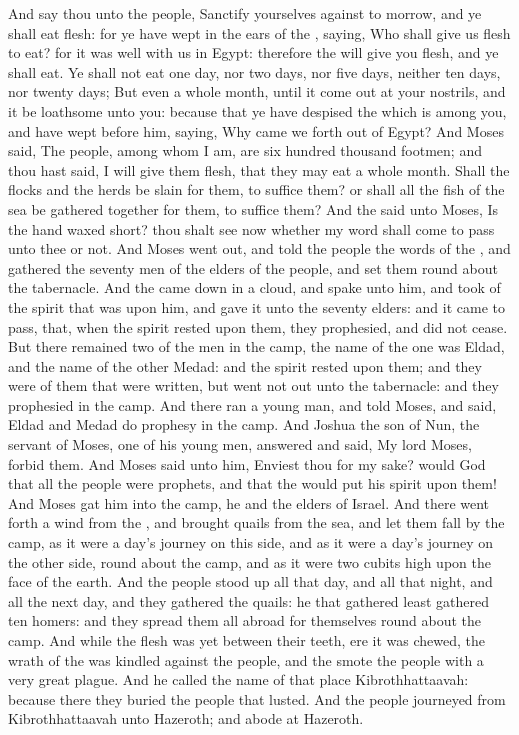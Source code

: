 \begin{biblechapter}
\verse And say thou unto the people, Sanctify yourselves against to morrow, and ye shall eat flesh: for ye have wept in the ears of the \LORD, saying, Who shall give us flesh to eat? for it was well with us in Egypt: therefore the \LORD will give you flesh, and ye shall eat.
\verse Ye shall not eat one day, nor two days, nor five days, neither ten days, nor twenty days;
\verse But even a whole month, until it come out at your nostrils, and it be loathsome unto you: because that ye have despised the \LORD which is among you, and have wept before him, saying, Why came we forth out of Egypt?
\verse And Moses said, The people, among whom I am, are six hundred thousand footmen; and thou hast said, I will give them flesh, that they may eat a whole month.
\verse Shall the flocks and the herds be slain for them, to suffice them? or shall all the fish of the sea be gathered together for them, to suffice them?
\verse And the \LORD said unto Moses, Is the \LORDs hand waxed short? thou shalt see now whether my word shall come to pass unto thee or not.
\verse And Moses went out, and told the people the words of the \LORD, and gathered the seventy men of the elders of the people, and set them round about the tabernacle.
\verse And the \LORD came down in a cloud, and spake unto him, and took of the spirit that was upon him, and gave it unto the seventy elders: and it came to pass, that, when the spirit rested upon them, they prophesied, and did not cease.
\verse But there remained two of the men in the camp, the name of the one was Eldad, and the name of the other Medad: and the spirit rested upon them; and they were of them that were written, but went not out unto the tabernacle: and they prophesied in the camp.
\verse And there ran a young man, and told Moses, and said, Eldad and Medad do prophesy in the camp.
\verse And Joshua the son of Nun, the servant of Moses, one of his young men, answered and said, My lord Moses, forbid them.
\verse And Moses said unto him, Enviest thou for my sake? would God that all the \LORDs people were prophets, and that the \LORD would put his spirit upon them!
\verse And Moses gat him into the camp, he and the elders of Israel.
\verse And there went forth a wind from the \LORD, and brought quails from the sea, and let them fall by the camp, as it were a day's journey on this side, and as it were a day's journey on the other side, round about the camp, and as it were two cubits high upon the face of the earth.
\verse And the people stood up all that day, and all that night, and all the next day, and they gathered the quails: he that gathered least gathered ten homers: and they spread them all abroad for themselves round about the camp.
\verse And while the flesh was yet between their teeth, ere it was chewed, the wrath of the \LORD was kindled against the people, and the \LORD smote the people with a very great plague.
\verse And he called the name of that place Kibrothhattaavah: because there they buried the people that lusted.
\verse And the people journeyed from Kibrothhattaavah unto Hazeroth; and abode at Hazeroth.
\end{biblechapter}

